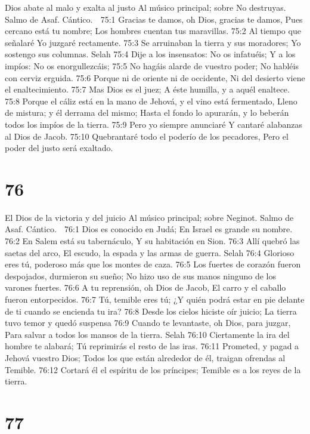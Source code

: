 Dios abate al malo y exalta al justo 
Al músico principal; sobre No destruyas. Salmo de Asaf. Cántico. 

75:1 Gracias te damos, oh Dios, gracias te damos, 
Pues cercano está tu nombre; 
Los hombres cuentan tus maravillas. 
75:2 Al tiempo que señalaré 
Yo juzgaré rectamente. 
75:3 Se arruinaban la tierra y sus moradores; 
Yo sostengo sus columnas. Selah 
75:4 Dije a los insensatos: No os infatuéis; 
Y a los impíos: No os enorgullezcáis; 
75:5 No hagáis alarde de vuestro poder; 
No habléis con cerviz erguida. 
75:6 Porque ni de oriente ni de occidente, 
Ni del desierto viene el enaltecimiento. 
75:7 Mas Dios es el juez; 
A éste humilla, y a aquél enaltece. 
75:8 Porque el cáliz está en la mano de Jehová, y el vino está fermentado, 
Lleno de mistura; y él derrama del mismo; 
Hasta el fondo lo apurarán, y lo beberán todos los impíos de la tierra. 
75:9 Pero yo siempre anunciaré 
Y cantaré alabanzas al Dios de Jacob. 
75:10 Quebrantaré todo el poderío de los pecadores, 
Pero el poder del justo será exaltado. 

\chapter{76}

El Dios de la victoria y del juicio 
Al músico principal; sobre Neginot. Salmo de Asaf. Cántico. 

76:1 Dios es conocido en Judá; 
En Israel es grande su nombre. 
76:2 En Salem está su tabernáculo, 
Y su habitación en Sion. 
76:3 Allí quebró las saetas del arco, 
El escudo, la espada y las armas de guerra. Selah 
76:4 Glorioso eres tú, poderoso más que los montes de caza. 
76:5 Los fuertes de corazón fueron despojados, durmieron su sueño; 
No hizo uso de sus manos ninguno de los varones fuertes. 
76:6 A tu reprensión, oh Dios de Jacob, 
El carro y el caballo fueron entorpecidos. 
76:7 Tú, temible eres tú; 
¿Y quién podrá estar en pie delante de ti cuando se encienda tu ira? 
76:8 Desde los cielos hiciste oír juicio; 
La tierra tuvo temor y quedó suspensa 
76:9 Cuando te levantaste, oh Dios, para juzgar, 
Para salvar a todos los mansos de la tierra. Selah 
76:10 Ciertamente la ira del hombre te alabará; 
Tú reprimirás el resto de las iras. 
76:11 Prometed, y pagad a Jehová vuestro Dios; 
Todos los que están alrededor de él, traigan ofrendas al Temible. 
76:12 Cortará él el espíritu de los príncipes; 
Temible es a los reyes de la tierra. 

\chapter{77}

